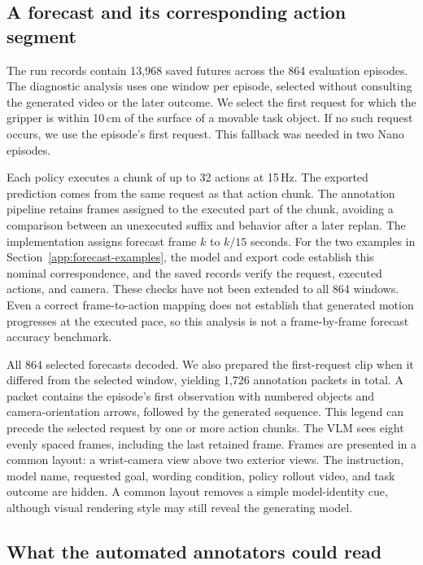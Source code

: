 \documentclass{article}
\begin{document}
\subsection{A forecast and its corresponding action segment}

The run records contain 13,968 saved futures across the 864 evaluation episodes. The diagnostic analysis uses one window per episode, selected without consulting the generated video or the later outcome. We select the first request for which the gripper is within 10\,cm of the surface of a movable task object. If no such request occurs, we use the episode's first request. This fallback was needed in two Nano episodes.

Each policy executes a chunk of up to 32 actions at 15\,Hz. The exported prediction comes from the same request as that action chunk. The annotation pipeline retains frames assigned to the executed part of the chunk, avoiding a comparison between an unexecuted suffix and behavior after a later replan. The implementation assigns forecast frame $k$ to $k/15$ seconds. For the two examples in Section~\ref{app:forecast-examples}, the model and export code establish this nominal correspondence, and the saved records verify the request, executed actions, and camera. These checks have not been extended to all 864 windows. Even a correct frame-to-action mapping does not establish that generated motion progresses at the executed pace, so this analysis is not a frame-by-frame forecast accuracy benchmark.

All 864 selected forecasts decoded. We also prepared the first-request clip when it differed from the selected window, yielding 1,726 annotation packets in total. A packet contains the episode's first observation with numbered objects and camera-orientation arrows, followed by the generated sequence. This legend can precede the selected request by one or more action chunks. The VLM sees eight evenly spaced frames, including the last retained frame. Frames are presented in a common layout: a wrist-camera view above two exterior views. The instruction, model name, requested goal, wording condition, policy rollout video, and task outcome are hidden. A common layout removes a simple model-identity cue, although visual rendering style may still reveal the generating model.

\subsection{What the automated annotators could read}
\end{document}
